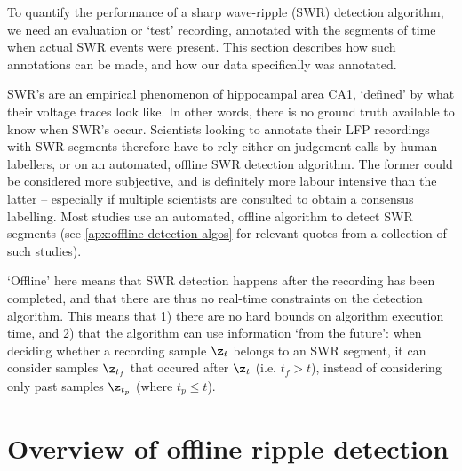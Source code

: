 \label{ch:offline}

To quantify the performance of a sharp wave-ripple (SWR) detection algorithm, we need an evaluation or `test' recording, annotated with the segments of time when actual SWR events were present. This section describes how such annotations can be made, and how our data specifically was annotated.

SWR's are an empirical phenomenon of hippocampal area CA1, `defined' by what their voltage traces look like. In other words, there is no ground truth available to know when SWR's occur. Scientists looking to annotate their LFP recordings with SWR segments therefore have to rely either on judgement calls by human labellers, or on an automated, offline SWR detection algorithm. The former could be considered more subjective, and is definitely more labour intensive than the latter -- especially if multiple scientists are consulted to obtain a consensus labelling. Most studies use an automated, offline algorithm to detect SWR segments (see \cref{apx:offline-detection-algos} for relevant quotes from a collection of such studies).

`Offline' here means that SWR detection happens after the recording has been completed, and that there are thus no real-time constraints on the detection algorithm. This means that 1) there are no hard bounds on algorithm execution time, and 2) that the algorithm can use information `from the future': when deciding whether a recording sample $\z_t$ belongs to an SWR segment, it can consider samples $\z_{t_f}$ that occured after $\z_t$ (i.e. $t_f > t$), instead of considering only past samples $\z_{t_p}$ (where $t_p \leq t$).


\begin{figure}
\label{fig:offline-steps}
\end{figure}    


\section{Overview of offline ripple detection}

